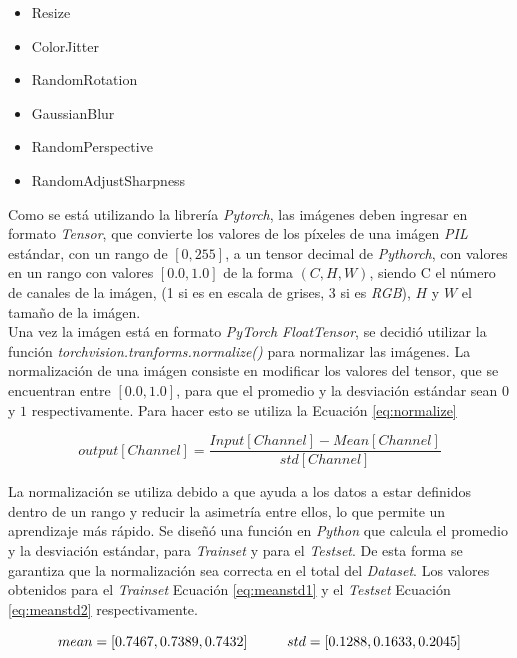 \begin{itemize}
	\item Resize
	\item ColorJitter
	\item RandomRotation
	\item GaussianBlur
	\item RandomPerspective
	\item RandomAdjustSharpness
\end{itemize}

Como se está utilizando la librería \textit{Pytorch}, las imágenes deben ingresar en formato \textit{Tensor}, que convierte los valores de los píxeles de una imágen \textit{PIL} estándar, con un rango de $[0, 255]$,  a un tensor decimal de \textit{Pythorch}, con valores en un rango con valores $[0.0, 1.0]$ de la forma  $(C, H, W)$, siendo C el número de canales de la imágen, (1 si es en escala de grises, 3 si es \textit{RGB}), $H$ y $W$ el tamaño de la imágen. \\

Una vez la imágen está en formato \textit{PyTorch FloatTensor}, se decidió utilizar la función \textit{torchvision.tranforms.normalize()} para normalizar las imágenes. La normalización de una imágen consiste en modificar los valores del tensor, que se encuentran entre $[0.0, 1.0]$, para que el promedio y la desviación estándar sean $0$ y $1$ respectivamente. Para hacer esto se utiliza la Ecuación \ref{eq:normalize} \cite{Pytorch}

\begin{equation}
	{output[Channel]=\frac{Input[Channel]-Mean[Channel]}{std[Channel]}}
	\label{eq:normalize}
\end{equation}

La normalización se utiliza debido a que ayuda a los datos a estar definidos dentro de un rango y reducir la asimetría entre ellos, lo que permite un aprendizaje más rápido. Se diseñó una función en \textit{Python} que calcula el promedio y la desviación estándar, para \textit{Trainset} y para el \textit{Testset}. De esta forma se garantiza que la normalización sea correcta en el total del \textit{Dataset}. Los valores obtenidos para el \textit{Trainset} Ecuación \ref{eq:meanstd1} y el \textit{Testset} Ecuación \ref{eq:meanstd2} respectivamente.

\begin{equation}				{mean = [0.7467, 0.7389, 0.7432] \hspace*{1cm}  std  = [0.1288, 0.1633, 0.2045]}
	\label{eq:meanstd1}
\end{equation}


